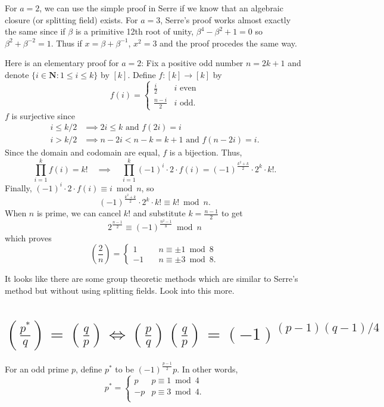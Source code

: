 \documentclass[b5paper,12pt,oneside,openright]{memoir}
\newcommand{\jacobi}[2]{\left(\frac{#1}{#2}\right)}
\begin{document}
For $a=2$, we can use the simple proof in Serre if we know that an algebraic closure (or splitting field) exists. For $a=3$, Serre's proof works almost exactly the same since if $\beta$ is a primitive 12th root of unity, $\beta^4-\beta^2+1=0$ so $\beta^2 + \beta^{-2} = 1$. Thus if $x=\beta + \beta^{-1}$, $x^2 = 3$ and the proof procedes the same way.

Here is an elementary proof for $a=2$: Fix a positive odd number $n = 2k+1$ and denote $\{i\in\mathbf{N} : 1\leq i\leq k\}$ by $[k]$.
Define $f:[k]\to[k]$ by
\[f(i) =
  \begin{cases}
    \frac{i}{2} &i\textrm{ even}\\
    \frac{n-i}{2} &i\textrm{ odd}.
  \end{cases}
\]
$f$ is surjective since
\begin{align*}
  i\leq k/2 &\implies 2i\leq k\textrm{ and }f(2i) = i\\
  i > k/2 &\implies n-2i < n-k = k+1\textrm{ and }f(n-2i) = i.
\end{align*}
Since the domain and codomain are equal, $f$ is a bijection. Thus,
\[\prod_{i=1}^k f(i) = k!\quad\implies\quad\prod_{i=1}^k (-1)^i\cdot 2\cdot f(i) = (-1)^\frac{k^2 + k}{2}\cdot 2^k\cdot k!.\]
Finally, $(-1)^i\cdot 2\cdot f(i)\equiv i\bmod n$, so
\[(-1)^\frac{k^2 + k}{2}\cdot 2^k\cdot k!\equiv k!\bmod n.\]
When $n$ is prime, we can cancel $k!$ and substitute $k=\frac{n-1}{2}$ to get
\[2^\frac{n-1}{2}\equiv (-1)^\frac{n^2 - 1}{8}\bmod n\]
which proves
\[\left(\frac{2}{n}\right) =
  \begin{cases}
     1 &\quad n\equiv\pm 1\bmod 8\\
    -1 &\quad n\equiv\pm 3\bmod 8.
  \end{cases}
\]

It looks like there are some group theoretic methods which are similar to Serre's method but without using splitting fields. Look into this more.

\section{$\jacobi{p^*}{q}=\jacobi{q}{p}\iff \jacobi{p}{q}\jacobi{q}{p}=(-1)^{(p-1)(q-1)/4}$}

For an odd prime $p$, define $p^*$ to be $(-1)^\frac{p-1}{2} p$. In other words,
\[p^*=
\begin{cases}
  p&p\equiv 1\bmod 4\\
  -p&p\equiv 3\bmod 4.\\
\end{cases}
\]
\end{document}
